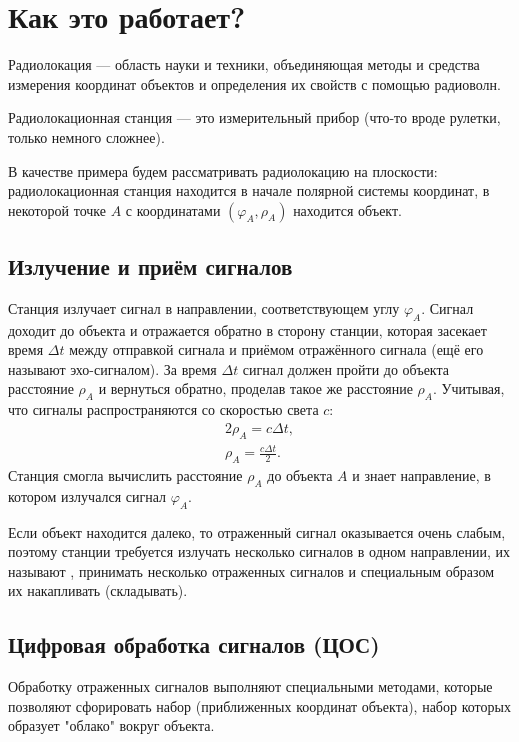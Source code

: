 \section{Как это работает?}

Радиолокация --- область науки и техники, объединяющая методы и средства измерения координат объектов и определения их свойств
с помощью радиоволн.

Радиолокационная станция --- это измерительный прибор (что-то вроде рулетки, только немного сложнее).

В качестве примера будем рассматривать радиолокацию на плоскости: радиолокационная станция находится в начале полярной системы координат,
в некоторой точке $A$ с координатами $(\varphi_A, \rho_A)$ находится объект.

\subsection{Излучение и приём сигналов}

Станция излучает сигнал в направлении, соответствующем углу $\varphi_A$. Сигнал доходит до объекта и отражается обратно в сторону станции,
которая засекает время $\Delta t$ между отправкой сигнала и приёмом отражённого сигнала (ещё его называют эхо-сигналом). За время $\Delta t$ сигнал должен
пройти до объекта расстояние $\rho_A$ и вернуться обратно, проделав такое же расстояние $\rho_A$. Учитывая, что сигналы распространяются со
скоростью света $c$:
\begin{gather*}
    2 \rho_A = c \Delta t , \\
    \rho_A = \frac{c \Delta t}{2} .
\end{gather*}
Станция смогла вычислить расстояние $\rho_A$ до объекта $A$ и знает направление, в котором излучался сигнал $\varphi_A$.

Если объект находится далеко, то отраженный сигнал оказывается очень слабым, поэтому станции требуется излучать несколько сигналов в одном
направлении, их называют , принимать несколько отраженных сигналов и специальным образом их накапливать (складывать).

\subsection{Цифровая обработка сигналов (ЦОС)}

Обработку отраженных сигналов выполняют специальными методами, которые позволяют сфорировать набор  (приближенных
координат объекта), набор которых образует "облако"{} вокруг объекта.


